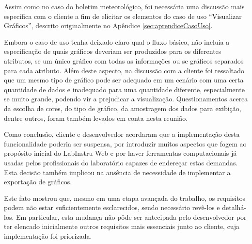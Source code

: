 Assim como no caso do boletim meteorológico, foi necessária uma discussão mais específica com o cliente a fim de elicitar os elementos do caso de uso ``Visualizar Gráficos'', descrito originalmente no Apêndice \ref{sec:aprendiceCasoUso}.

Embora o caso de uso tenha deixado claro qual o fluxo básico, não incluía a especificação de quais gráficos deveriam ser produzidos para os diferentes atributos, se um único gráfico com todas as informações ou se gráficos separados para cada atributo. Além deste aspecto, na discussão com a cliente foi ressaltado que um mesmo tipo de gráfico pode ser adequado em um cenário com uma certa quantidade de dados e inadequado para uma quantidade diferente, especialmente se muito grande, podendo vir a  prejudicar a visualização. Questionamentos acerca da escolha de cores, do tipo de gráfico, da amostragem dos dados para exibição, dentre outros, foram também levados em conta nesta reunião.

Como conclusão, cliente e desenvolvedor acordaram que a implementação desta funcionalidade poderia ser suspensa, por introduzir muitos aspectos que fogem ao propósito inicial do LabInstru Web e por haver ferramentas computacionais já usadas pelos profissionais do laboratório capazes de endereçar estas demandas. Esta decisão também implicou na ausência de necessidade de implementar a exportação de gráficos.

Este fato mostrou que, mesmo em uma etapa avançada do trabalho, os requisitos podem não estar suficientemente esclarecidos, sendo necessário revê-los e detalhá-los. Em particular, esta mudança não pôde ser antecipada pelo desenvolvedor por ter elencado inicialmente outros requisitos mais essenciais junto ao cliente, cuja implementação foi priorizada.
